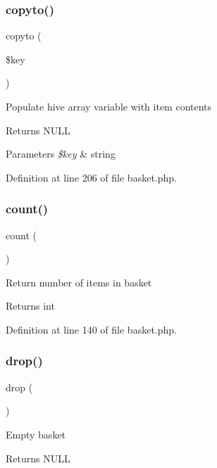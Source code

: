 \subsubsection{\texorpdfstring{copyto()}{copyto()}}
{\footnotesize\ttfamily copyto (\begin{DoxyParamCaption}\item[{}]{\$key }\end{DoxyParamCaption})}

Populate hive array variable with item contents \begin{DoxyReturn}{Returns}
N\+U\+LL 
\end{DoxyReturn}

\begin{DoxyParams}{Parameters}
{\em \$key} & string \\
\hline
\end{DoxyParams}


Definition at line 206 of file basket.\+php.

\hypertarget{class_basket_ac751e87b3d4c4bf2feb03bee8b092755}{}\label{class_basket_ac751e87b3d4c4bf2feb03bee8b092755} 
\subsubsection{\texorpdfstring{count()}{count()}}
{\footnotesize\ttfamily count (\begin{DoxyParamCaption}{ }\end{DoxyParamCaption})}

Return number of items in basket \begin{DoxyReturn}{Returns}
int 
\end{DoxyReturn}


Definition at line 140 of file basket.\+php.

\hypertarget{class_basket_aeb639e5b2b713ed87ab8f2033af98ae8}{}\label{class_basket_aeb639e5b2b713ed87ab8f2033af98ae8} 
\subsubsection{\texorpdfstring{drop()}{drop()}}
{\footnotesize\ttfamily drop (\begin{DoxyParamCaption}{ }\end{DoxyParamCaption})}

Empty basket \begin{DoxyReturn}{Returns}
N\+U\+LL 
\end{DoxyReturn}



